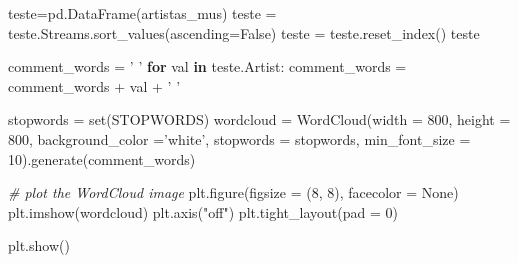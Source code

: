 \documentclass[11pt]{article}
\newenvironment{Shaded}{}{}
\newcommand{\KeywordTok}[1]{\textcolor[rgb]{0.00,0.44,0.13}{\textbf{{#1}}}}
\newcommand{\DecValTok}[1]{\textcolor[rgb]{0.25,0.63,0.44}{{#1}}}
\newcommand{\StringTok}[1]{\textcolor[rgb]{0.25,0.44,0.63}{{#1}}}
\newcommand{\CommentTok}[1]{\textcolor[rgb]{0.38,0.63,0.69}{\textit{{#1}}}}
\newcommand{\NormalTok}[1]{{#1}}
\newcommand{\VariableTok}[1]{\textcolor[rgb]{0.10,0.09,0.49}{{#1}}}
\newcommand{\ControlFlowTok}[1]{\textcolor[rgb]{0.00,0.44,0.13}{\textbf{{#1}}}}
\newcommand{\OperatorTok}[1]{\textcolor[rgb]{0.40,0.40,0.40}{{#1}}}
\newcommand{\BuiltInTok}[1]{{#1}}
\begin{document}
    \begin{Shaded}
\begin{Highlighting}[]
\NormalTok{    teste}\OperatorTok{=}\NormalTok{pd.DataFrame(artistas_mus)}
\NormalTok{    teste }\OperatorTok{=}\NormalTok{ teste.Streams.sort_values(ascending}\OperatorTok{=}\VariableTok{False}\NormalTok{)}
\NormalTok{    teste }\OperatorTok{=}\NormalTok{ teste.reset_index()}
\NormalTok{    teste}

\NormalTok{    comment_words }\OperatorTok{=} \StringTok{' '}
    \ControlFlowTok{for}\NormalTok{ val }\KeywordTok{in}\NormalTok{ teste.Artist:}
\NormalTok{        comment_words }\OperatorTok{=}\NormalTok{ comment_words }\OperatorTok{+}\NormalTok{ val }\OperatorTok{+} \StringTok{' '}

\NormalTok{    stopwords }\OperatorTok{=} \BuiltInTok{set}\NormalTok{(STOPWORDS)}
\NormalTok{    wordcloud }\OperatorTok{=}\NormalTok{ WordCloud(width }\OperatorTok{=} \DecValTok{800}\NormalTok{, height }\OperatorTok{=} \DecValTok{800}\NormalTok{,}
\NormalTok{                    background_color }\OperatorTok{=}\StringTok{'white'}\NormalTok{,}
\NormalTok{                    stopwords }\OperatorTok{=}\NormalTok{ stopwords,}
\NormalTok{                    min_font_size }\OperatorTok{=} \DecValTok{10}\NormalTok{).generate(comment_words)}

    \CommentTok{# plot the WordCloud image                       }
\NormalTok{    plt.figure(figsize }\OperatorTok{=}\NormalTok{ (}\DecValTok{8}\NormalTok{, }\DecValTok{8}\NormalTok{), facecolor }\OperatorTok{=} \VariableTok{None}\NormalTok{)}
\NormalTok{    plt.imshow(wordcloud)}
\NormalTok{    plt.axis(}\StringTok{"off"}\NormalTok{)}
\NormalTok{    plt.tight_layout(pad }\OperatorTok{=} \DecValTok{0}\NormalTok{)}

\NormalTok{    plt.show()}
\end{Highlighting}
\end{Shaded}
\end{document}
